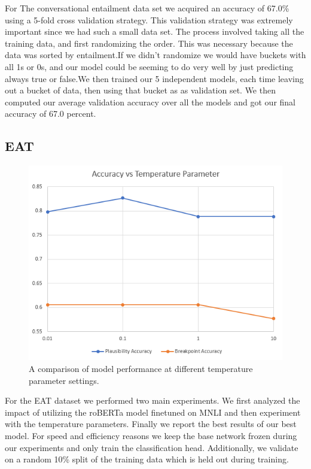 \documentclass[11pt,a4paper]{article}
\begin{document}
 For The conversational entailment data set we acquired an accuracy of 67.0\% using a 5-fold cross validation strategy. This validation strategy was extremely important since we had such a small data set. The process involved taking all the training data, and first randomizing the order. This was necessary because the data was sorted by entailment.If we didn't randomize we would have buckets with all 1s or 0s, and our model could be seeming to do very well by just predicting always true or false.We then trained our 5 independent models, each time leaving out a bucket of data, then using that bucket as as validation set. We then computed our average validation accuracy over all the models and got our final accuracy of 67.0 percent.

\subsection{EAT}

\begin{figure}[t]
    \centering
    \includegraphics[width=\linewidth]{assets/eat_graph1.png}
    \caption{A comparison of model performance at different temperature parameter settings.}
\end{figure}

For the EAT dataset we performed two main experiments. We first analyzed the impact of utilizing the roBERTa model finetuned on MNLI and then experiment with the temperature parameters. Finally we report the best results of our best model. For speed and efficiency reasons we keep the base network frozen during our experiments and only train the classification head. Additionally, we validate on a random 10\% split of the training data which is held out during training.
\end{document}
